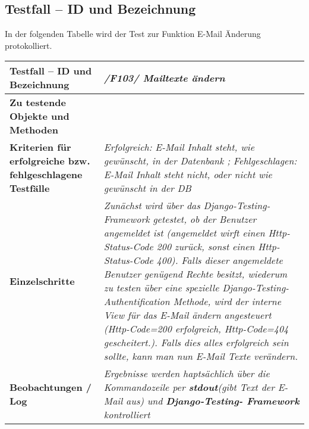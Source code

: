 \subsection{Testfall -- ID und Bezeichnung}
In der folgenden Tabelle wird der Test zur Funktion E-Mail Änderung protokolliert.
\begin{longtable}{|p{5cm}|p{10cm}|}
\hline
\textbf{Testfall -- ID und Bezeichnung} &  \textit{/F103/ Mailtexte ändern} \\
\hline
\textbf{Zu testende Objekte und Methoden} &  \textit{
\begin{itemize}
\item In Komponente \emph{Admin} der Bereich E-Mail 
\end{itemize} }
\\
\hline
\textbf{Kriterien f\"ur erfolgreiche bzw. fehlgeschlagene Testf\"alle} &
\textit{Erfolgreich: E-Mail Inhalt steht, wie gewünscht, in der Datenbank ;
        Fehlgeschlagen: E-Mail Inhalt steht nicht, oder nicht wie gewünscht in der DB   } \\
\hline
\textbf{Einzelschritte} &  \textit{Zunächst wird über das Django-Testing-Framework getestet,
ob der Benutzer angemeldet ist (angemeldet wirft einen Http-Status-Code 200 zurück, sonst 
einen Http-Status-Code 400). Falls dieser angemeldete Benutzer genügend Rechte besitzt,
wiederum zu testen über eine spezielle Django-Testing-Authentification Methode, wird der interne View
für das E-Mail ändern angesteuert (Http-Code=200 erfolgreich, Http-Code=404 gescheitert.).
Falls dies alles erfolgreich sein sollte, kann man nun E-Mail Texte verändern.
} \\
\hline
\textbf{Beobachtungen / Log} &  \textit{Ergebnisse werden haptsächlich über 
die Kommandozeile per \textbf{stdout}(gibt Text der E-Mail aus) und \textbf{Django-Testing-
Framework} kontrolliert  } \\
\hline


 \end{longtable}


